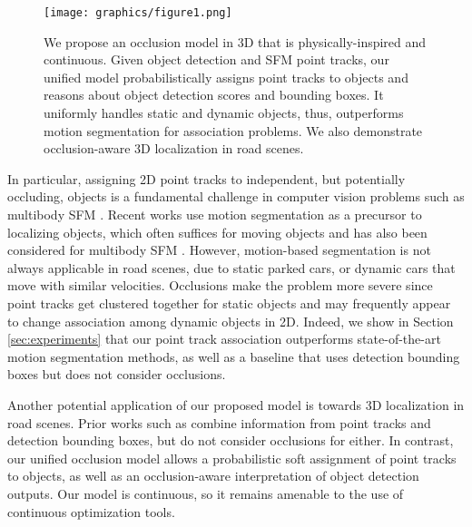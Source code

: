 %
\begin{wrapfigure}{r}{0.5\linewidth}
\begin{center}
\texttt{[image: graphics/figure1.png]}
\end{center}
\vspace{-0.6cm}
\caption{We propose an occlusion model in 3D that is physically-inspired and continuous. Given object detection and SFM point tracks, our unified model probabilistically assigns point tracks to objects and reasons about object detection scores and bounding boxes. It uniformly handles static and dynamic objects, thus, outperforms motion segmentation for association problems. We also demonstrate occlusion-aware 3D localization in road scenes.}
\label{fig:page1}
\vspace{-0.4cm}
\end{wrapfigure}%
%
In particular, assigning 2D point tracks to independent, but potentially occluding, objects is a fundamental challenge in computer vision problems such as multibody SFM \cite{Ozden_etal_2010}. Recent works use motion segmentation \cite{Brox_Malik_2010,Rao_etal_2010} as a precursor to localizing objects, which often suffices for moving objects \cite{Tron_Vidal_2007} and has also been considered for multibody SFM \cite{Kundu_etal_2011}. However, motion-based segmentation is not always applicable in road scenes, due to static parked cars, or dynamic cars that move with similar velocities. Occlusions make the problem more severe since point tracks get clustered together for static objects and may frequently appear to change association among dynamic objects in 2D.
Indeed, we show in Section \ref{sec:experiments} that our point track association outperforms state-of-the-art motion segmentation methods, as well as a baseline that uses detection bounding boxes but does not consider occlusions.



Another potential application of our proposed model is towards 3D localization in road scenes. Prior works such as \cite{Song_Chandraker_2015} combine information from point tracks and detection bounding boxes, but do not consider occlusions for either. In contrast, our unified occlusion model allows a probabilistic soft assignment of point tracks to objects, as well as an occlusion-aware interpretation of object detection outputs. Our model is continuous, so it remains amenable to the use of continuous optimization tools.

